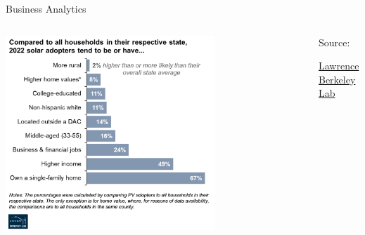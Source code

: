 \documentclass[aspectratio=169,t,11pt,table]{beamer}
\begin{document}
\begin{frame}{Business Analytics}
  \begin{columns}[T]
    \begin{column}{.7\textwidth}\vspace*{-\bigskipamount}
      \begin{center}
        \includegraphics[width = 0.7\textwidth]{figures/solar_demand.png}
      \end{center}
    \end{column}
    \begin{column}{.3\textwidth}
      Source:

      \href{https://emp.lbl.gov/solar-demographics-tool}{Lawrence Berkeley Lab}
    \end{column}
  \end{columns}
\end{frame}
\end{document}
